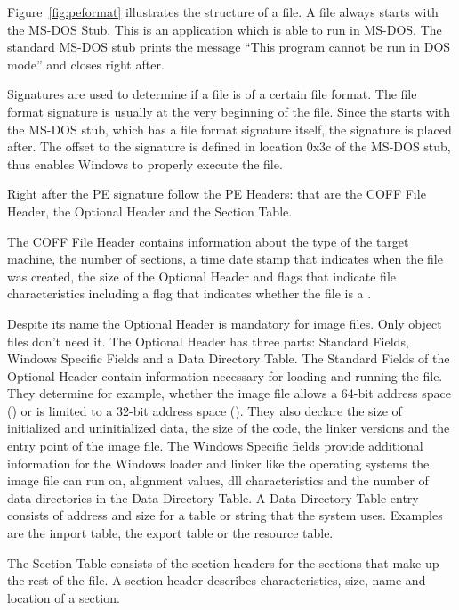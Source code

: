 Figure~\ref{fig:peformat} illustrates the structure of a \PE{} file. A \PE{} file always starts with the MS-DOS Stub. This is an application which is able to run in MS-DOS. The standard MS-DOS stub prints the message \enquote{This program cannot be run in DOS mode} and closes right after. 

Signatures are used to determine if a file is of a certain file format. The file format signature is usually at the very beginning of the file. Since the \PE{} starts with the MS-DOS stub, which has a file format signature itself, the \PE{} signature is placed after.  The offset to the \PE{} signature is defined in location 0x3c of the MS-DOS stub, thus enables Windows to properly execute the \PE{} file. 

Right after the PE signature follow the PE Headers: that are the COFF File Header, the Optional Header and the Section Table. 

The COFF File Header contains information about the type of the target machine, the number of sections, a time date stamp that indicates when the file was created, the size of the Optional Header and flags that indicate file characteristics including a flag that indicates whether the file is a \DLL{}\label{dllflag}.

Despite its name the Optional Header is mandatory for image files. Only object files don't need it. The Optional Header has three parts: Standard Fields, Windows Specific Fields and a Data Directory Table.
The Standard Fields of the Optional Header contain information necessary for loading and running the file. They determine for example, whether the image file allows a 64-bit address space (\PEplus{}) or is limited to a 32-bit address space (\PEsmall{}). They also declare \ia{} the size of initialized and uninitialized data, the size of the code, the linker versions and the entry point of the image file.
The Windows Specific fields provide additional information for the Windows loader and linker like the operating systems the image file can run on, alignment values, dll characteristics and the number of data directories in the Data Directory Table.
A Data Directory Table entry consists of address and size for a table or string that the system uses. Examples are the import table, the export table or the resource table. 

The Section Table consists of the section headers for the sections that make up the rest of the \PE{} file. A section header describes \ia{} characteristics, size, name and location of a section.

